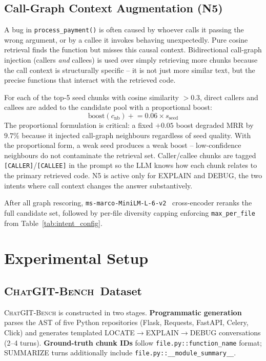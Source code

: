 \documentclass[conference]{IEEEtran}
\newcommand{\conv}{\textsc{ChatGIT-Bench}\xspace}
\begin{document}
\subsection{Call-Graph Context Augmentation (N5)}

A bug in \texttt{process\_payment()} is often caused
by whoever calls it passing the wrong argument, or by a callee it invokes
behaving unexpectedly. Pure cosine retrieval finds the function but misses
this causal context. Bidirectional call-graph injection (callers
\emph{and} callees) is used over simply retrieving more chunks because the call
context is structurally specific -- it is not just more similar text, but
the precise functions that interact with the retrieved code.

For each of the top-5 seed chunks with cosine similarity $>0.3$, direct
callers and callees are added to the candidate pool with a proportional boost:
\begin{equation}
\text{boost}(c_{\text{nb}}) \mathrel{+}= 0.06 \times s_{\text{seed}}
\end{equation}
The proportional formulation is critical: a fixed $+0.05$ boost degraded
MRR by $9.7\%$ because it injected call-graph neighbours regardless of seed
quality. With the proportional form, a weak seed produces a weak boost --
low-confidence neighbours do not contaminate the retrieval set.
Caller/callee chunks are tagged \texttt{[CALLER]}/\texttt{[CALLEE]} in the
prompt so the LLM knows how each chunk relates to the primary retrieved code.
N5 is active only for EXPLAIN and DEBUG, the two intents where call context
changes the answer substantively.

After all graph rescoring, \texttt{ms-marco-MiniLM-L-6-v2}~\cite{reimers2019sentencebert}
cross-encoder reranks the full candidate set, followed by per-file diversity
capping enforcing \texttt{max\_per\_file} from Table~\ref{tab:intent_config}.

\FloatBarrier
\section{Experimental Setup}

\subsection{\conv\ Dataset}

\conv is constructed in two stages. \textbf{Programmatic generation}
parses the AST of five Python repositories (Flask, Requests, FastAPI,
Celery, Click) and generates templated LOCATE$\to$EXPLAIN$\to$DEBUG
conversations (2--4 turns). \textbf{Ground-truth chunk IDs} follow
\texttt{file.py::function\_name} format; SUMMARIZE turns additionally
include \texttt{file.py::\_\_module\_summary\_\_}.
\end{document}

